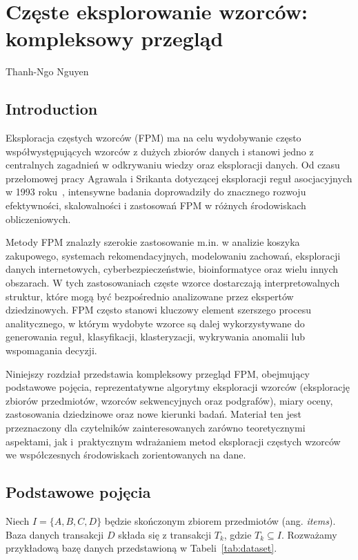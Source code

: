 \chapter[Częste eksplorowani \ldots]{Częste eksplorowanie wzorców: kompleksowy przegląd}
\thispagestyle{empty}
\vspace{-8mm} {\large Thanh-Ngo Nguyen} \vspace{8mm}


\section{Introduction}
Eksploracja częstych wzorców (FPM) ma na celu wydobywanie często współwystępujących wzorców z dużych zbiorów danych i stanowi jedno z centralnych zagadnień w odkrywaniu wiedzy oraz eksploracji danych. Od czasu przełomowej pracy Agrawala i Srikanta dotyczącej eksploracji reguł asocjacyjnych w 1993 roku~\cite{agrawal1994fast}, intensywne badania doprowadziły do znacznego rozwoju efektywności, skalowalności i zastosowań FPM w różnych środowiskach obliczeniowych.

Metody FPM znalazły szerokie zastosowanie m.in. w analizie koszyka zakupowego, systemach rekomendacyjnych, modelowaniu zachowań, eksploracji danych internetowych, cyberbezpieczeństwie, bioinformatyce oraz wielu innych obszarach. W tych zastosowaniach częste wzorce dostarczają interpretowalnych struktur, które mogą być bezpośrednio analizowane przez ekspertów dziedzinowych. FPM często stanowi kluczowy element szerszego procesu analitycznego, w którym wydobyte wzorce są dalej wykorzystywane do generowania reguł, klasyfikacji, klasteryzacji, wykrywania anomalii lub wspomagania decyzji.

Niniejszy rozdział przedstawia kompleksowy przegląd FPM, obejmujący podstawowe pojęcia, reprezentatywne algorytmy eksploracji wzorców (eksplorację zbiorów przedmiotów, wzorców sekwencyjnych oraz podgrafów), miary oceny, zastosowania dziedzinowe oraz nowe kierunki badań. Materiał ten jest przeznaczony dla czytelników zainteresowanych zarówno teoretycznymi aspektami, jak i~praktycznym wdrażaniem metod eksploracji częstych wzorców we współczesnych środowiskach zorientowanych na dane.

\section{Podstawowe pojęcia}
\label{sec:fundamentals}
Niech $I = \{A,B,C,D\}$ będzie skończonym zbiorem przedmiotów (ang. \textit{items}). Baza danych transakcji $D$ składa się z transakcji $T_k$, gdzie $T_k \subseteq I$. Rozważamy przykładową bazę danych przedstawioną w Tabeli~\ref{tab:dataset}.

